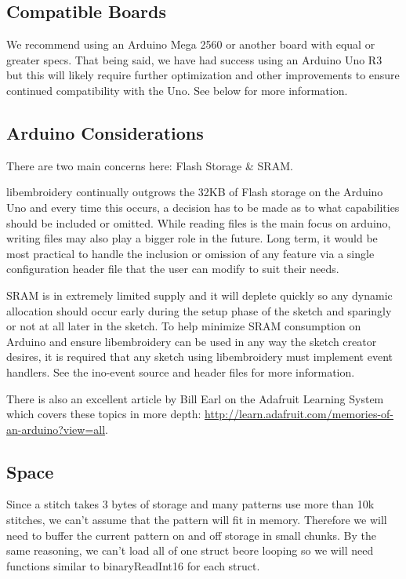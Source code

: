 \documentclass[onesize, a4paper]{refart}
\begin{document}
\subsection{Compatible Boards}

We recommend using an Arduino Mega 2560 or another board with equal or
greater specs. That being said, we have had success using an Arduino Uno
R3 but this will likely require further optimization and other
improvements to ensure continued compatibility with the Uno. See below
for more information.

\subsection{Arduino Considerations}

There are two main concerns here: Flash Storage \& SRAM.

libembroidery continually outgrows the 32KB of Flash storage on the
Arduino Uno and every time this occurs, a decision has to be made as to
what capabilities should be included or omitted. While reading files is
the main focus on arduino, writing files may also play a bigger role in
the future. Long term, it would be most practical to handle the
inclusion or omission of any feature via a single configuration header
file that the user can modify to suit their needs.

SRAM is in extremely limited supply and it will deplete quickly so any
dynamic allocation should occur early during the setup phase of the
sketch and sparingly or not at all later in the sketch. To help minimize
SRAM consumption on Arduino and ensure libembroidery can be used in any
way the sketch creator desires, it is required that any sketch using
libembroidery must implement event handlers. See the ino-event source
and header files for more information.

There is also an excellent article by Bill Earl on the Adafruit Learning
System which covers these topics in more depth:
\url{http://learn.adafruit.com/memories-of-an-arduino?view=all}.

\subsection{Space}

Since a stitch takes 3 bytes of storage and many patterns use more than
10k stitches, we can't assume that the pattern will fit in memory. Therefore
we will need to buffer the current pattern on and off storage in small
chunks. By the same reasoning, we can't load all of one struct beore
looping so we will need functions similar to binaryReadInt16 for each
struct.
\end{document}
